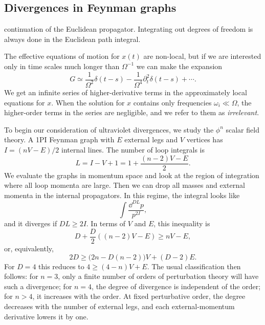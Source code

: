 \subsection{Divergences in Feynman graphs}

continuation of the Euclidean propagator. Integrating out degrees of freedom
is always done in the Euclidean path integral.

The effective equations of motion for $x(t)$ are non-local, but if we are
interested only in time scales much longer than $\Omega^{-1}$ we can make the
expansion
\[
  G\simeq\frac{1}{\Omega^2}\delta(t-s)
  -\frac{1}{\Omega^4}\partial_t^2\delta(t-s)+\cdots .
\]
We get an infinite series of higher-derivative terms in the approximately
local equations for $x$. When the solution for $x$ contains only frequencies
$\omega_i\ll\Omega$, the higher-order terms in the series are negligible, and
we refer to them as \emph{irrelevant}.

To begin our consideration of ultraviolet divergences, we study the $\phi^n$
scalar field theory. A 1PI Feynman graph with $E$ external legs and $V$
vertices has $I=(nV-E)/2$ internal lines. The number of loop integrals is
\[
  L=I-V+1=1+\frac{(n-2)V-E}{2} .
\]
We evaluate the graphs in momentum space and look at the region of integration
where all loop momenta are large. Then we can drop all masses and external
momenta in the internal propagators. In this regime, the integral looks like
\[
  \int\frac{\dd^{D L}p}{p^{2I}},
\]
and it diverges if $D L\geq2I$. In terms of $V$ and $E$, this inequality is
\[
  D+\frac{D}{2}((n-2)V-E)\geq nV-E,
\]
or, equivalently,
\[
  2D\geq\bigl(2n-D(n-2)\bigr)V+(D-2)E .
\]
For $D=4$ this reduces to $4\geq(4-n)V+E$. The usual classification then
follows: for $n=3$, only a finite number of orders of perturbation theory will
have such a divergence; for $n=4$, the degree of divergence is independent of
the order; for $n>4$, it increases with the order. At fixed perturbative order,
the degree decreases with the number of external legs, and each external-momentum
derivative lowers it by one.


